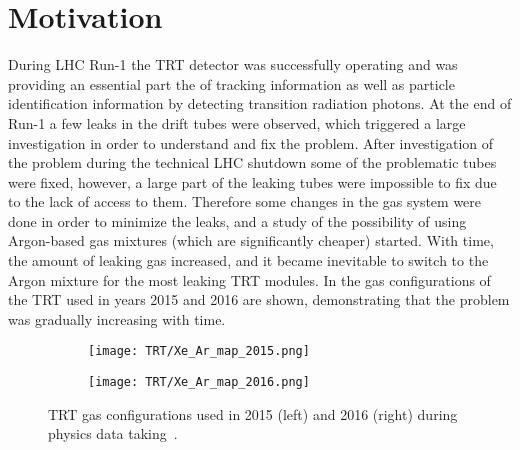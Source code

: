 \section{Motivation}
\label{sec:TRT_intro}

During LHC Run-1 the TRT detector was successfully operating and was providing an essential part the of tracking information 
as well as particle identification information by detecting transition radiation photons.
At the end of Run-1 
a few leaks in the drift tubes were observed, which triggered a large investigation in order to understand and fix the problem. 
After investigation of the problem during the technical LHC shutdown some of the problematic tubes were fixed, however, a large part of the leaking tubes were impossible to fix due to the lack of access to them.
Therefore some changes in the gas system were done in order to minimize the leaks, 
and a study of the possibility of using Argon-based gas mixtures (which are significantly cheaper) started. 
With time, the amount of leaking gas increased, and it became inevitable to switch to the Argon mixture 
for the most leaking TRT modules. In  the gas configurations of the TRT used in years 2015 and 2016 are shown, demonstrating that the problem was gradually increasing with time.

\begin{figure}[h]
\centering
\begin{subfigure}{.5\textwidth}
  \centering
  \texttt{[image: TRT/Xe\_Ar\_map\_2015.png]}
  \label{fig:sub1}
\end{subfigure}%
\begin{subfigure}{.5\textwidth}
  \centering
  \texttt{[image: TRT/Xe\_Ar\_map\_2016.png]}
  \label{fig:sub2}
\end{subfigure}
\caption{TRT gas configurations used in 2015 (left) and 2016 (right) during physics data taking~\cite{trt_public_plots_2016}.}
\label{fig:mixed_condition_2015_2016}
\end{figure}

